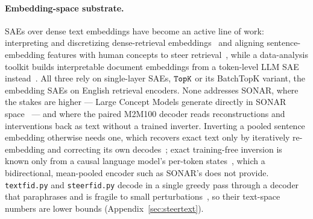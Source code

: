 \documentclass[11pt]{article}
\begin{document}
\paragraph{Embedding-space substrate.}
SAEs over dense text embeddings have become an active line of work:
interpreting and discretizing dense-retrieval
embeddings~\cite{park2025decodingdenseembeddingssparse} and aligning
sentence-embedding features with human concepts to steer
retrieval~\cite{shin2026aligningsentenceembeddingshuman}, while a
data-analysis toolkit builds interpretable document embeddings from a
token-level LLM SAE instead~\cite{jiang2026interpretableembeddingssparseautoencoders}.
All three rely on single-layer SAEs, $\mathop{\mathtt{TopK}}\limits$ or its BatchTopK variant, the
embedding SAEs on English retrieval encoders. None addresses SONAR, where
the stakes are higher --- Large Concept Models generate directly in SONAR
space~\cite{lcmteam2024largeconceptmodelslanguage} --- and where the paired
M2M100 decoder reads reconstructions and interventions back as text
without a trained inverter. Inverting a pooled sentence embedding
otherwise needs one, which recovers exact text only by iteratively
re-embedding and correcting its own
decodes~\cite{morris2023textembeddingsrevealalmost}; exact training-free
inversion is known only from a causal language model's per-token
states~\cite{nikolaou2025}, which a bidirectional, mean-pooled encoder
such as SONAR's does not provide. \texttt{textfid.py} and
\texttt{steerfid.py} decode in a single greedy pass through a decoder that
paraphrases and is fragile to small
perturbations~\cite{sonar,lcmteam2024largeconceptmodelslanguage}, so their
text-space numbers are lower bounds (Appendix~\ref{sec:steertext}).
\end{document}
